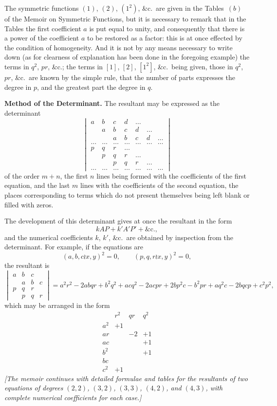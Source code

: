 \documentclass[11pt,a4paper]{book}
\begin{document}
\begin{center}
The symmetric functions $(1)$, $(2)$, $(1^2)$, \&c.\ are given in the Tables~$(b)$
of the Memoir on Symmetric Functions, but it is necessary to remark that in
the Tables the first coefficient $a$ is put equal to unity, and consequently
that there is a power of the coefficient $a$ to be restored as a factor: this
is at once effected by the condition of homogeneity. And it is not by any
means necessary to write down (as for clearness of explanation has been done
in the foregoing example) the terms in $q^2$, $pr$, \&c.; the terms in $[1]$,
$[2]$, $[1^2]$, \&c.\ being given, those in $q^2$, $pr$, \&c.\ are known by
the simple rule, that the number of parts expresses the degree in $p$, and the
greatest part the degree in $q$.

\newpage
\textbf{Method of the Determinant.} The resultant may be expressed as the
determinant
\[
\begin{vmatrix}
a & b & c & d & \ldots \\
  & a & b & c & d & \ldots \\
  &   & a & b & c & d & \ldots \\
\ldots & \ldots & \ldots & \ldots & \ldots & \ldots & \ldots \\[-0.5em]
p & q & r & \ldots \\
  & p & q & r & \ldots \\
  &   & p & q & r & \ldots \\
\ldots & \ldots & \ldots & \ldots & \ldots & \ldots & \ldots
\end{vmatrix}
\]
of the order $m + n$, the first $n$ lines being formed with the coefficients
of the first equation, and the last $m$ lines with the coefficients of the
second equation, the places corresponding to terms which do not present
themselves being left blank or filled with zeros.

The development of this determinant gives at once the resultant in the form
\[
kAP + k'A'P' + \&\text{c.},
\]
and the numerical coefficients $k$, $k'$, \&c.\ are obtained by inspection from
the determinant. For example, if the equations are
\[
(a, b, c \wr x, y)^2 = 0, \qquad (p, q, r \wr x, y)^2 = 0,
\]
the resultant is
\[
\begin{vmatrix}
a & b & c \\
  & a & b & c \\
p & q & r \\
  & p & q & r
\end{vmatrix}
= a^2 r^2 - 2abqr + b^2 q^2 + acq^2 - 2acpr + 2bp^2 c - b^2 pr + aq^2 c
- 2bqcp + c^2 p^2,
\]
which may be arranged in the form
\[
\begin{array}{c|ccc}
& r^2 & qr & q^2 \\
\hline
a^2 & +1 \\
ar & & -2 & +1 \\
ac & & & +1 \\
b^2 & & & +1 \\
bc & & \\
c^2 & +1
\end{array}
\]
\textit{[The memoir continues with detailed formulae and tables for the
resultants of two equations of degrees $(2,2)$, $(3,2)$, $(3,3)$, $(4,2)$,
and $(4,3)$, with complete numerical coefficients for each case.]}


\end{center}
\end{document}
